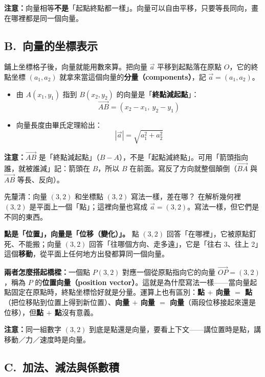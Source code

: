 \documentclass[11pt]{article}
\begin{document}
\textbf{注意：}向量相等\textbf{不是}「起點終點都一樣」。向量可以自由平移，只要等長同向，畫在哪裡都是同一個向量。

\subsection*{\sffamily B.\ 向量的坐標表示}

鋪上坐標格子後，向量就能用數來算。把向量 $\vec a$ 平移到起點落在原點 $O$，它的終點坐標 $(a_1,a_2)$ 就拿來當這個向量的\textbf{分量（components）}，記 $\vec a=(a_1,a_2)$。

\begin{itemize}\setlength{\itemsep}{1pt}
\item 由 $A(x_1,y_1)$ 指到 $B(x_2,y_2)$ 的向量是「\textbf{終點減起點}」：
$$\boxed{\;\overrightarrow{AB}=(x_2-x_1,\ y_2-y_1)\;}$$
\item 向量長度由畢氏定理給出：
$$\boxed{\;|\vec a|=\sqrt{a_1^2+a_2^2}\;}$$
\end{itemize}

\textbf{注意：}$\overrightarrow{AB}$ 是「終點減起點」（$B-A$），不是「起點減終點」。可用「箭頭指向誰，就被誰減」記：箭頭在 $B$，所以 $B$ 在前面。寫反了方向就整個顛倒（$\overrightarrow{BA}$ 與 $\overrightarrow{AB}$ 等長、反向）。

\begin{補充框}{先釐清：向量 $(3,2)$ 和坐標點 $(3,2)$ 寫法一樣，差在哪？}
在解析幾何裡 $(3,2)$ 是平面上一個「點」；這裡向量也寫成 $\vec a=(3,2)$。寫法一樣，但它們是不同的東西。

\textbf{點是「位置」，向量是「位移（變化）」。} 點 $(3,2)$ 回答「在哪裡」，它被原點釘死、不能搬；向量 $(3,2)$ 回答「往哪個方向、走多遠」，它是「往右 3、往上 2」這個\textbf{移動}，從平面上任何地方出發都算同一個向量。

\textbf{兩者怎麼搭起橋樑：}一個點 $P(3,2)$ 對應一個從原點指向它的向量 $\overrightarrow{OP}=(3,2)$，稱為 $P$ 的\textbf{位置向量（position vector）}。這就是為什麼寫法一樣——當向量起點固定在原點時，終點坐標恰好就是分量。運算上也有區別：\textbf{點 $+$ 向量 $=$ 點}（把位移貼到位置上得到新位置）、\textbf{向量 $+$ 向量 $=$ 向量}（兩段位移接起來還是位移），但\textbf{點 $+$ 點}沒有意義。

\textbf{注意：}同一組數字 $(3,2)$ 到底是點還是向量，要看上下文——講位置時是點，講移動／力／速度時是向量。
\end{補充框}

\subsection*{\sffamily C.\ 加法、減法與係數積}
\end{document}
